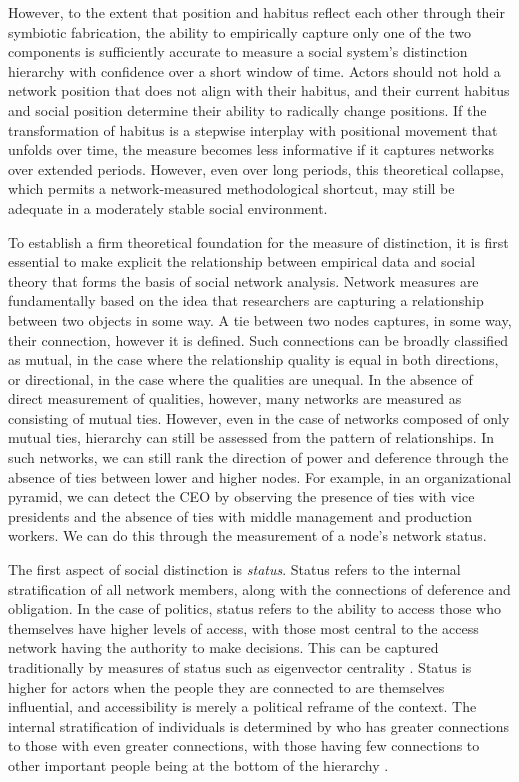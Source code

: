\documentclass[12pt]{article}
\begin{document}
However, to the extent that position and habitus reflect each other through their symbiotic fabrication, the ability to empirically capture only one of the two components is sufficiently accurate to measure a social system's distinction hierarchy with confidence over a short window of time. Actors should not hold a network position that does not align with their habitus, and their current habitus and social position determine their ability to radically change positions. If the transformation of habitus is a stepwise interplay with positional movement that unfolds over time, the measure becomes less informative if it captures networks over extended periods. However, even over long periods, this theoretical collapse, which permits a network-measured methodological shortcut, may still be adequate in a moderately stable social environment. 

To establish a firm theoretical foundation for the measure of distinction, it is first essential to make explicit the relationship between empirical data and social theory that forms the basis of social network analysis. Network measures are fundamentally based on the idea that researchers are capturing a relationship between two objects in some way. A tie between two nodes captures, in some way, their connection, however it is defined. Such connections can be broadly classified as mutual, in the case where the relationship quality is equal in both directions, or directional, in the case where the qualities are unequal. In the absence of direct measurement of qualities, however, many networks are measured as consisting of mutual ties. However, even in the case of networks composed of only mutual ties, hierarchy can still be assessed from the pattern of relationships. In such networks, we can still rank the direction of power and deference through the absence of ties between lower and higher nodes. For example, in an organizational pyramid, we can detect the CEO by observing the presence of ties with vice presidents and the absence of ties with middle management and production workers. We can do this through the measurement of a node's network status. 

The first aspect of social distinction is \textit{status}. Status refers to the internal stratification of all network members, along with the connections of deference and obligation. In the case of politics, status refers to the ability to access those who themselves have higher levels of access, with those most central to the access network having the authority to make decisions. This can be captured traditionally by measures of status such as eigenvector centrality \citep{bonacich1972factoring-03e}. Status is higher for actors when the people they are connected to are themselves influential, and accessibility is merely a political reframe of the context. The internal stratification of individuals is determined by who has greater connections to those with even greater connections, with those having few connections to other important people being at the bottom of the hierarchy \citep{bonacich1972factoring-03e}. 
\end{document}
